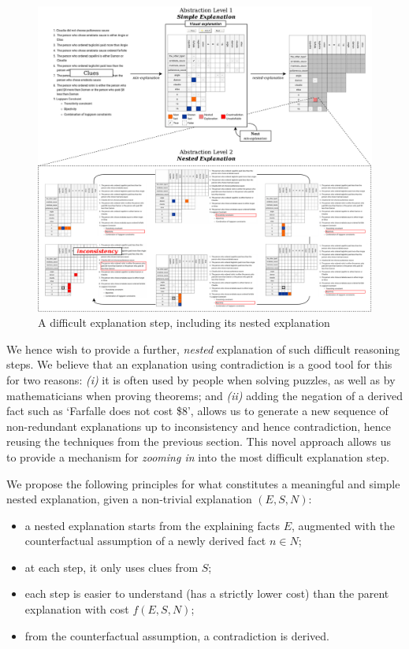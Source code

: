 \begin{figure}[t!]
    \centering
    \includegraphics[width=\textwidth]{figures/inconsistency.jpg}
    \caption{A difficult explanation step, including its nested explanation}\label{fig:pasta_diff}
\end{figure}

We hence wish to provide a further, \textit{nested} explanation of such difficult reasoning steps. We believe that an explanation using contradiction is a good tool for this for two reasons: \emph{(i)} it is often used by people when solving puzzles, as well as by mathematicians when proving theorems; and \emph{(ii)} adding the negation of a derived fact such as `Farfalle does not cost \$8', allows us to generate a new sequence of non-redundant explanations up to inconsistency and hence contradiction, hence reusing the techniques from the previous section.
This novel approach allows us to provide a mechanism for \emph{zooming in} into the most difficult explanation step.


We propose the following principles for what constitutes a meaningful and simple nested explanation, given a non-trivial explanation $(E,S,N)$:
\begin{itemize}
    \item a nested explanation starts from the explaining facts $E$,
          augmented with the counterfactual assumption of a newly derived fact $n \in N$;
    \item at each step, it only uses clues from $S$;
    \item each step is easier to understand (has a strictly lower cost) than the parent explanation with cost $f(E,S,N)$;
    \item from the counterfactual assumption, a contradiction is derived.
\end{itemize}

